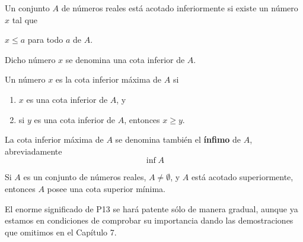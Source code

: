 \begin{tcolorbox}
    \begin{def.}
	Un conjunto $A$ de números reales está acotado inferiormente si existe un número $x$ tal que
	\begin{center}
	    $x\leq a$ para todo $a$ de $A$.
	\end{center}
	Dicho número $x$ se denomina una cota inferior de $A$.
    \end{def.}
\end{tcolorbox}

\begin{tcolorbox}
    \begin{def.}
	Un número $x$ es la cota inferior máxima de $A$ si
	\begin{enumerate}[\bfseries (1)]
	    \item $x$ es una cota inferior de $A$, y
	    \item si $y$ es una cota inferior de $A$, entonces $x\geq y$.
	\end{enumerate}
	La cota inferior máxima de $A$ se denomina también el \textbf{ínfimo} de $A$, abreviadamente
	$$\inf A$$
    \end{def.}
\end{tcolorbox}

\begin{tcolorbox}
\begin{prop}
    Si $A$ es un conjunto de números reales, $A\neq \emptyset$, y $A$ está acotado superiormente, entonces $A$ posee una cota superior mínima. 
\end{prop}
\end{tcolorbox}

El enorme significado de P13 se hará patente sólo de manera gradual, aunque ya estamos en condiciones de comprobar su importancia dando las demostraciones que omitimos en el Capítulo 7.\\


